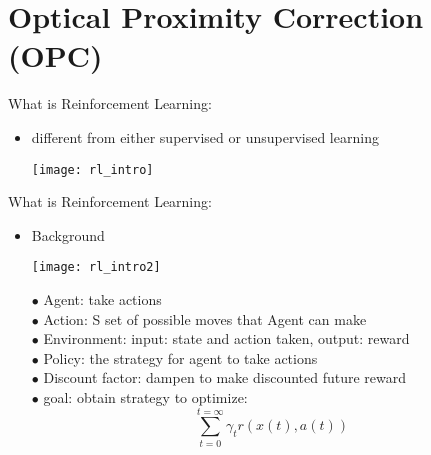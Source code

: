 \graphicspath{{./figs/repo/}{./figs/}}
\section{Optical Proximity Correction (OPC)}


\begin{frame}{What is Reinforcement Learning:}
    
    \begin{itemize}
        \item different from either supervised or unsupervised learning\\

        \begin{center}\texttt{[image: rl\_intro]}\end{center}
   
        
    \end{itemize}
\end{frame}


\begin{frame}{What is Reinforcement Learning:}
    
    \begin{itemize}
        \item Background\\

        \begin{center}\texttt{[image: rl\_intro2]}\end{center}
        \hspace{0.5cm}$\bullet$ Agent: take actions\\
        \hspace{0.5cm}$\bullet$ Action: S set of possible moves that Agent can make\\
        \hspace{0.5cm}$\bullet$ Environment: input: state and action taken, output: reward\\
        \hspace{0.5cm}$\bullet$ Policy: the strategy for agent to take actions\\
        \hspace{0.5cm}$\bullet$ Discount factor: dampen to make discounted future reward\\
        \hspace{0.5cm}$\bullet$ goal: obtain strategy to optimize:
        \begin{equation}
         \sum_{t=0}^{t=\infty} \gamma_{t}r(x(t),a(t))
        \end{equation}


   
        
    \end{itemize}
\end{frame}


